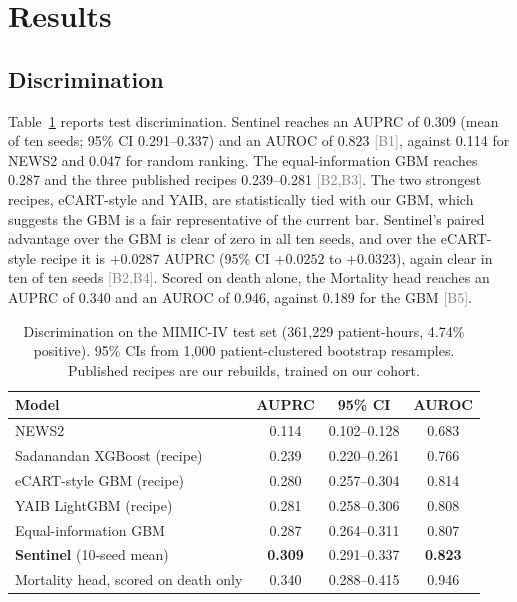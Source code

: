 \documentclass[11pt]{article}
\newcommand{\ev}[1]{\textcolor{gray}{\scriptsize[#1]}}   %
\begin{document}
\section{Results}\label{sec:results}

\subsection{Discrimination}
Table~\ref{tab:discrimination} reports test discrimination. Sentinel reaches an
AUPRC of 0.309 (mean of ten seeds; 95\% CI 0.291--0.337) and an AUROC of 0.823
\ev{B1}, against 0.114 for NEWS2 and 0.047 for random ranking. The
equal-information GBM reaches 0.287 and the three published recipes 0.239--0.281
\ev{B2,B3}. The two strongest recipes, eCART-style and YAIB, are statistically
tied with our GBM, which suggests the GBM is a fair representative of the current
bar. Sentinel's paired advantage over the GBM is clear of zero in all ten seeds,
and over the eCART-style recipe it is $+0.0287$ AUPRC (95\% CI $+0.0252$ to
$+0.0323$), again clear in ten of ten seeds \ev{B2,B4}. Scored on death alone,
the Mortality head reaches an AUPRC of 0.340 and an AUROC of 0.946, against 0.189
for the GBM \ev{B5}.

\begin{table}[t]
\centering
\small
\caption{Discrimination on the MIMIC-IV test set (361{,}229 patient-hours, 4.74\%
positive). 95\% CIs from 1{,}000 patient-clustered bootstrap resamples.
Published recipes are our rebuilds, trained on our cohort.}\label{tab:discrimination}
\begin{tabular}{@{}lccc@{}}
\toprule
Model & AUPRC & 95\% CI & AUROC \\
\midrule
NEWS2 & 0.114 & 0.102--0.128 & 0.683 \\
Sadanandan XGBoost (recipe) & 0.239 & 0.220--0.261 & 0.766 \\
eCART-style GBM (recipe) & 0.280 & 0.257--0.304 & 0.814 \\
YAIB LightGBM (recipe) & 0.281 & 0.258--0.306 & 0.808 \\
Equal-information GBM & 0.287 & 0.264--0.311 & 0.807 \\
\textbf{Sentinel} (10-seed mean) & \textbf{0.309} & 0.291--0.337 & \textbf{0.823} \\
\midrule
Mortality head, scored on death only & 0.340 & 0.288--0.415 & 0.946 \\
\bottomrule
\end{tabular}
\end{table}
\end{document}
